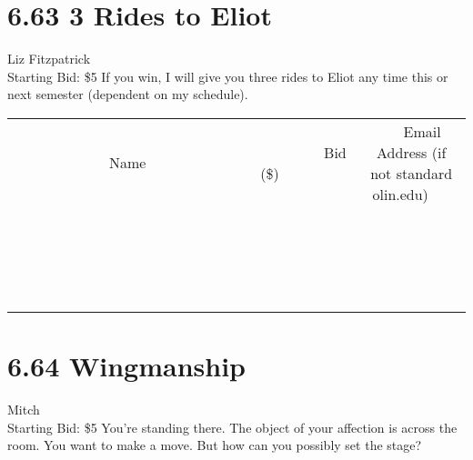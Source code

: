 \documentclass[11pt]{article}
\begin{document}
\section*{6.63 3 Rides to Eliot}
Liz Fitzpatrick
\\
Starting Bid: \$5
\newline
If you win, I will give you three rides to Eliot any time this or next semester (dependent on my schedule).
\\[3ex]
\begin{tabular}{c c c}
~~~~~~~~~~~~~Name~~~~~~~~~~~~~ & ~~~~~~~~~Bid (\$)~~~~~~~~~  & ~~~Email Address (if not standard olin.edu)~~~\\
 & & \\
\hline
 & & \\
\hline
 & & \\
\hline
 & & \\
\hline
 & & \\
\hline
 & & \\
\hline
 & & \\
\hline
 & & \\
\hline
 & & \\
\hline
 & & \\
\hline
 & & \\
\hline
 & & \\
\hline
 & & \\
\hline
 & & \\
\hline
 & & \\
\hline
 & & \\
\hline
 & & \\
\hline
 & & \\
\hline
 & & \\
\hline
\end{tabular}
\newpage
\section*{6.64 Wingmanship}
Mitch
\\
Starting Bid: \$5
\newline
You're standing there. The object of your affection is across the room. You want to make a move. But how can you possibly set the stage?
\end{document}

